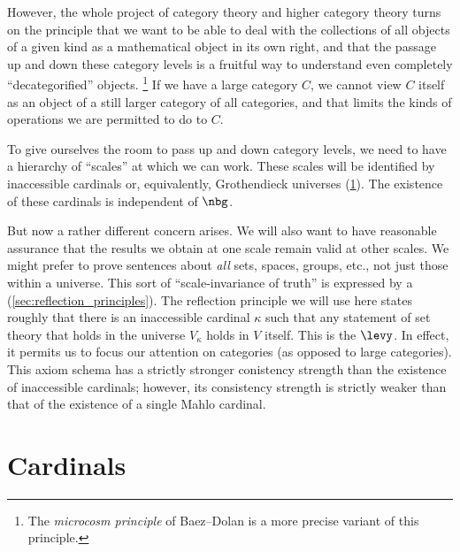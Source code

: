 However, the whole project of category theory and higher category theory turns on the principle that
we want to be able to deal with the collections of all objects of a given kind
as a mathematical object in its own right,
and that the passage up and down these category levels
is a fruitful way to understand even completely \enquote{decategorified} objects.%
\footnote{The \emph{microcosm principle} of Baez--Dolan is a more precise variant of this principle.} 
If we have a large category $C$, we cannot view $C$ itself as an object of a still larger category of all categories,
and that limits the kinds of operations we are permitted to do to $ C $.

To give ourselves the room to pass up and down category levels,
we need to have a hierarchy of \enquote{scales} at which we can work.
These scales will be identified by inaccessible cardinals
or, equivalently, Grothendieck universes (\ref{sec:cardinals}).
The existence of these cardinals is independent of $ \nbg $.

But now a rather different concern arises.
We will also want to have reasonable assurance
that the results we obtain at one scale remain valid at other scales.
We might prefer to prove sentences about
\emph{all} sets, spaces, groups, etc., not just those within a universe.
This sort of \enquote{scale-invariance of truth}
is expressed by a  (\ref{sec:reflection_principles}).
The reflection principle we will use here states roughly that
there is an inaccessible cardinal $ \kappa $ such that
any statement of set theory that holds in the universe $ V_{\kappa} $ holds in $V$ itself.
This is the  $ \levy $.
In effect, it permits us to focus our attention on categories (as opposed to large categories).
This axiom schema has a strictly stronger conistency strength than the existence of inaccessible cardinals;
however, its consistency strength is strictly weaker than that of the existence of a single Mahlo cardinal.

\section{Cardinals}%
\label{sec:cardinals}

